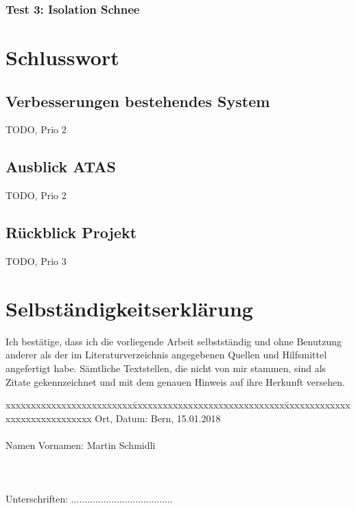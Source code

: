 \documentclass[11pt,english,german]{report}
\theoremstyle{definition}
\begin{document}

\newpage
\subsection{Test 3: Isolation Schnee}

\chapter{Schlusswort}
\section{Verbesserungen bestehendes System}
TODO, Prio 2
\section{Ausblick ATAS}
TODO, Prio 2
\section{Rückblick Projekt}
TODO, Prio 3

\chapter*{Selbständigkeitserklärung}
\label{chap:selbstaendigkeitserklaerung}

\vspace*{10mm} 

Ich bestätige, dass ich die vorliegende Arbeit selbstständig und ohne Benutzung anderer als der im Literaturverzeichnis angegebenen Quellen und Hilfsmittel angefertigt habe. Sämtliche Textstellen, die nicht von mir stammen, sind als Zitate gekennzeichnet und mit dem genauen Hinweis auf ihre Herkunft versehen. 

\vspace{15mm}

\begin{tabbing}
xxxxxxxxxxxxxxxxxxxxxxxxx\=xxxxxxxxxxxxxxxxxxxxxxxxxxxxxx\=xxxxxxxxxxxxxxxxxxxxxxxxxxxxxx\kill
Ort, Datum:\> Bern, 15.01.2018 \\ \\
Namen Vornamen:\> Martin Schmidli  \\ \\ \\ \\ 
Unterschriften:\> ...................................... \\
\end{tabbing}
\end{document}
